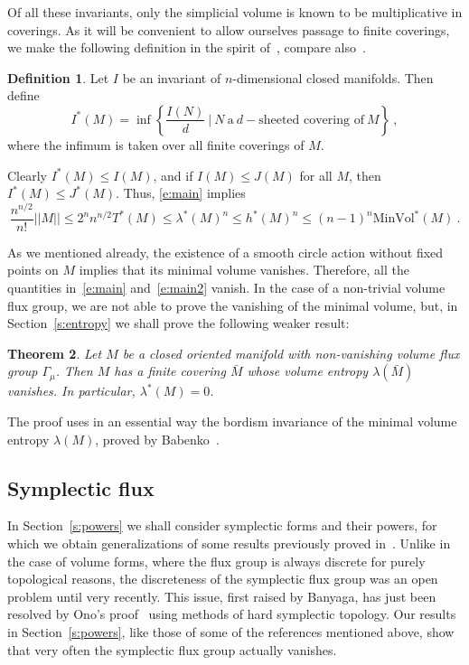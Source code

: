 \documentclass[12pt]{amsart}
\newtheorem{theorem}{Theorem}%
\theoremstyle{definition}
\newtheorem{definition}[theorem]{Definition}
\theoremstyle{remark}
\begin{document}
Of all these invariants, only the simplicial volume is known to be multiplicative in 
coverings. As it will be convenient to allow ourselves passage to finite coverings,
we make the following definition in the spirit of~\cite{MT}, compare also~\cite{BCG0}.

\begin{definition}
Let $I$ be an invariant of $n$-dimensional closed manifolds. Then define
$$
I^*(M)=\inf\left\{ \frac{I(N)}{d} \ \vert \ N \ \textrm{a} \ d-\textrm{sheeted covering of}  \ M \right\} \ , 
$$
where the infimum is taken over all finite coverings of $M$.
\end{definition}
Clearly $I^*(M)\leq I(M)$, and if $I(M)\leq J(M)$ for all $M$, then $I^*(M)\leq J^*(M)$. Thus,
\eqref{e:main} implies
\begin{equation}\label{e:main2}
    \frac{n^{n/2}}{n!} \vert\vert M \vert\vert \leq 2^{n}n^{n/2} T^*(M) \leq 
    \lambda^*(M)^{n}\leq h^*(M)^{n}\leq (n-1)^{n}\text{MinVol}^*(M) \ .
    \end{equation}

As we mentioned already, the existence of a smooth circle action without fixed points on $M$ implies that its minimal
volume vanishes. Therefore, all the quantities in~\eqref{e:main} and~\eqref{e:main2}
vanish. In the case of a non-trivial volume flux group, we are not able to prove the vanishing of the minimal
volume, but, in Section~\ref{s:entropy} we shall prove the following weaker result:
\begin{theorem}\label{t:entropyA}
    Let $M$ be a closed oriented manifold with non-vanishing volume flux 
    group $\Gamma_{\mu}$. Then $M$ has a finite covering $\bar M$ 
    whose volume entropy $\lambda (\bar M)$ vanishes. In particular, $\lambda^*(M)=0$.
\end{theorem}
The proof uses in an essential way the bordism invariance of the minimal volume entropy $\lambda (M)$,
proved by Babenko~\cite{B2}.

\subsection{Symplectic flux}
In Section~\ref{s:powers} we shall consider symplectic forms and their powers, for which we obtain 
generalizations of some results previously proved in~\cite{McDuff,Kedra,KM}. 
Unlike in the case of volume forms, where the flux group is always discrete for 
purely topological reasons, the discreteness of the symplectic flux group was 
an open problem until very recently. This issue, first raised by Banyaga, has
just been resolved by Ono's proof~\cite{Ono} using methods of hard symplectic 
topology. Our results in Section~\ref{s:powers}, like those of some of the references
mentioned above, show that very often the symplectic flux group actually vanishes.
\end{document}
